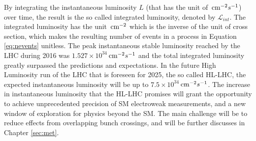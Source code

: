 By integrating the instantaneous luminosity $L$ (that has the unit of $\,\text{cm}^{-2}s^{-1}$) over time, the result is the so called integrated luminosity, denoted by $\mathcal{L}_{int}$. 
The integrated luminosity has the unit $\,\text{cm}^{-2}$ which is the inverse of the unit of cross section, which makes the resulting number of events in a process in Equation \ref{eq:nevents} unitless. 
The peak instantaneous stable luminosity reached by the LHC during 2016 was $1.527\times10^{34}$$\,\text{cm}^{-2}s^{-1}$ and the total integrated luminosity greatly surpassed the predictions and expectations. 
In the future High Luminosity run of the LHC that is foreseen for 2025, the so called HL-LHC, the expected instantaneous luminosity will be up to $7.5\times10^{34}$$\,\text{cm}^{-2}s^{-1}$. 
The increase in instantaneous luminosity that the HL-LHC promises will grant the opportunity to achieve unprecedented precision of SM electroweak measurements, and a new window of exploration for physics beyond the SM.
The main challenge will be to reduce effects from overlapping bunch crossings, and will be further discusses in Chapter \ref{sec:met}.  
